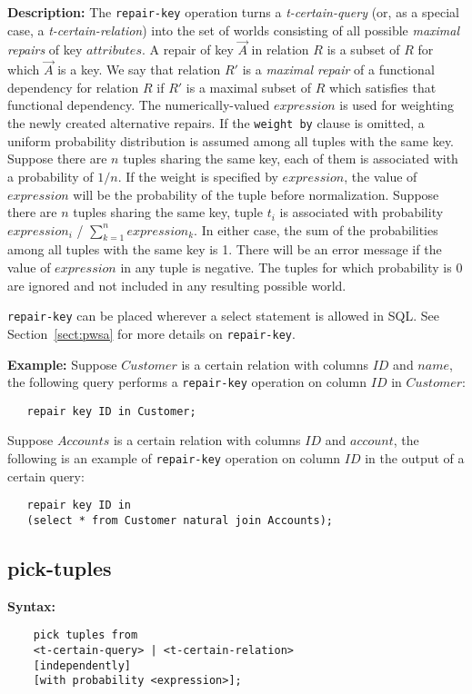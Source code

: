 \noindent \textbf{Description:}
The {\tt repair-key} operation turns a {\em t-certain-query}\/
(or, as a special case, a {\em t-certain-relation}\/) into the set of worlds consisting of all possible
{\em maximal repairs}\/ of key $attributes$. A repair of key $\vec{A}$ in 
relation $R$ is a subset of $R$ for which $\vec{A}$ is a key.
We say that relation $R'$ is a {\em maximal repair}\/ of a functional dependency 
for relation $R$ if $R'$ is a maximal subset of $R$ which satisfies that 
functional dependency. The numerically-valued $expression$ is used for 
weighting the newly created alternative repairs.
If the {\tt weight by} clause is omitted, a uniform probability distribution is assumed among all tuples with 
the same key. Suppose there are $n$ tuples sharing the same key, each of them is 
associated with a probability of $1/n$. If the weight is specified by $expression$, 
the value of $expression$ will be the probability of the tuple before normalization. 
Suppose there are $n$ tuples sharing the same key, tuple $t_i$ is associated 
with probability $expression_i$ / $\sum_{k=1}^n expression_k$. In either case, 
the sum of the probabilities among all tuples with the same key is 1. 
There will be an error message if the value of $expression$ in any tuple is 
negative. The tuples for which probability is 0 are ignored and not included in any resulting possible world.

{\tt repair-key} can be placed wherever a select statement is allowed in SQL. 
See Section~\ref{sect:pwsa} for more details on {\tt repair-key}.

\noindent \textbf{Example:}
Suppose $Customer$ is a certain
relation with columns $ID$ and $name$, the following query performs a {\tt repair-key} operation on column $ID$ in $Customer$: 

\begin{verbatim}
   repair key ID in Customer;
\end{verbatim}

Suppose $Accounts$ is a certain relation with columns $ID$ and $account$, the following is an example of {\tt repair-key} operation on column $ID$ in the output of a certain query: 

\begin{verbatim}
   repair key ID in 
   (select * from Customer natural join Accounts);
\end{verbatim}



\subsection{pick-tuples}
\textbf{Syntax:}
\begin{verbatim}
    pick tuples from 
    <t-certain-query> | <t-certain-relation>
    [independently] 
    [with probability <expression>];
\end{verbatim}

